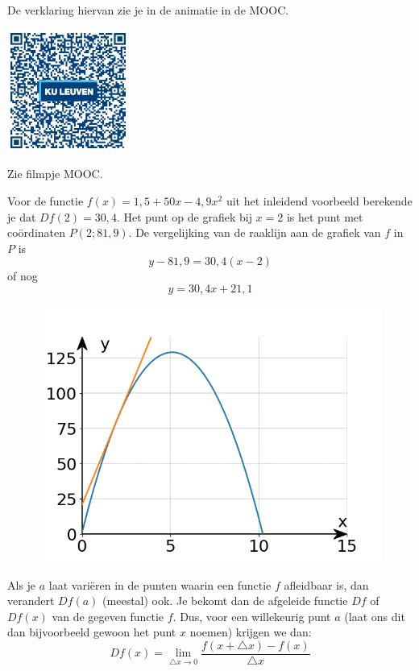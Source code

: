 De verklaring hiervan zie je in de animatie in de MOOC.

\begin{minipage}{.25\linewidth}
	\raggedright
	\includegraphics[width=4cm]{6_afgeleiden_integralen/inputs/QR_Code_AFGANIMATIE_module6_1new}
\end{minipage}
\begin{minipage}{.7\linewidth}
	Zie filmpje MOOC.
\end{minipage}

\begin{voorbeeld}
	Voor de functie $f(x)=1,5+50 x -4,9 x^2$ uit het inleidend voorbeeld berekende je dat $Df(2)=30,4$.
	Het punt op de grafiek bij $x=2$ is het punt met co\"ordinaten $P(2;81,9)$.
	De vergelijking van de raaklijn aan de grafiek van $f$ in $P$ is
	\[
	y-81,9=30,4(x-2)
	\]
	of nog
	\[
	y=30,4x+21,1
	\]
	
	\begin{figure}[h]
		\begin{center}
			\includegraphics[height=5 cm]{6_afgeleiden_integralen/inputs/1_2_vb3}
		\end{center}
	\end{figure}
\end{voorbeeld}\vspace{0,5 cm}

\begin{definitie}
	Als je $a$ laat variëren in de punten waarin een functie
	$f$ afleidbaar is, dan verandert $Df(a)$ (meestal) ook. Je bekomt
	dan de afgeleide functie $Df$ of $Df(x)$ van de gegeven functie
	$f$. Dus, voor een willekeurig punt $a$ (laat ons dit dan bijvoorbeeld
	gewoon het punt $x$ noemen) krijgen we dan:
	\[
	Df(x)={\displaystyle \lim_{\triangle x\to0}}\frac{f(x+\triangle x)-f(x)}{\triangle x}
	\]
\end{definitie}

